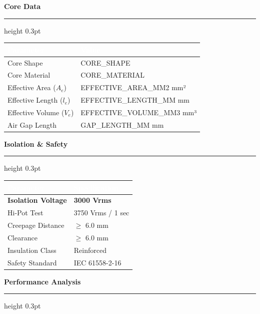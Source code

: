 \documentclass[10pt,a4paper]{article}
\newcommand{\sectiontitle}[1]{%
    \vspace{3mm}%
    {\large\bfseries\color{primary}#1}%
    \vspace{1mm}%
    \hrule height 0.3pt%
    \vspace{2mm}%
}
\begin{document}
\vspace{4mm}

\begin{minipage}[t]{0.48\textwidth}
\sectiontitle{Core Data}
{\footnotesize
\begin{tabular}{|L{35mm}|L{25mm}|}
\hline
{}
\textcolor{white}{\textbf{Parameter}} & \textcolor{white}{\textbf{Value}} \\
\hline
Core Shape & {{CORE_SHAPE}} \\
Core Material & {{CORE_MATERIAL}} \\
Effective Area ($A_e$) & {{EFFECTIVE_AREA_MM2}} mm² \\
Effective Length ($l_e$) & {{EFFECTIVE_LENGTH_MM}} mm \\
Effective Volume ($V_e$) & {{EFFECTIVE_VOLUME_MM3}} mm³ \\
Air Gap Length & {{GAP_LENGTH_MM}} mm \\
\hline
\end{tabular}
}
\end{minipage}
\hfill
\begin{minipage}[t]{0.48\textwidth}
\sectiontitle{Isolation \& Safety}
{\footnotesize
\begin{tabular}{|L{35mm}|L{25mm}|}
\hline
{}
\textcolor{white}{\textbf{Parameter}} & \textcolor{white}{\textbf{Specification}} \\
\hline
\textbf{Isolation Voltage} & \textbf{3000 Vrms} \\
Hi-Pot Test & 3750 Vrms / 1 sec \\
Creepage Distance & $\geq$ 6.0 mm \\
Clearance & $\geq$ 6.0 mm \\
Insulation Class & Reinforced \\
Safety Standard & IEC 61558-2-16 \\
\hline
\end{tabular}
}
\end{minipage}

\vspace{4mm}

\sectiontitle{Performance Analysis}
\end{document}
